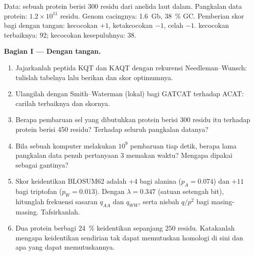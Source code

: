 \begin{problem}
\label{pb:b3:bioinformatics:1}
Data: sebuah protein berisi \num{300} residu dari anelida laut dalam.
Pangkalan data protein: $1.2\times 10^{11}$ residu. Genom cacingnya:
\qty{1.6}{Gb}, \qty{38}{\%} GC. Pemberian skor bagi  dengan tangan:
kecocokan $+1$, ketakcocokan $-1$, celah $-1$.  kecocokan 
terbaiknya: $92$; kecocokan kesepuluhnya: $38$.

\medskip
\noindent\textbf{Bagian I --- Dengan tangan.}
\begin{enumerate}
  \item Jajarkanlah peptida KQT dan KAQT dengan rekurensi
        Needleman--Wunsch: tulislah tabelnya lalu berikan  dan
        skor optimumnya.
  \item Ulangilah dengan Smith--Waterman (lokal) bagi GATCAT terhadap ACAT:
        carilah  terbaiknya dan skornya.
  \item Berapa pembaruan sel yang dibutuhkan  protein
        berisi \num{300} residu itu terhadap protein berisi \num{450}
        residu? Terhadap seluruh pangkalan datanya?
  \item Bila sebuah komputer melakukan $10^{9}$ pembaruan tiap detik, berapa
        lama  pangkalan data penuh pertanyaan 3 memakan waktu?
        Mengapa  dipakai sebagai gantinya?
  \item Skor keidentikan BLOSUM62 adalah $+4$ bagi alanina ($p_{A} =
        0.074$) dan $+11$ bagi triptofan ($p_{W} = 0.013$). Dengan
        $\lambda = 0.347$ (satuan setengah bit), hitunglah frekuensi
        sasaran $q_{AA}$ dan $q_{WW}$, serta nisbah $q/p^{2}$ bagi
        masing-masing. Tafsirkanlah.
  \item Dua protein berbagi \qty{24}{\%} keidentikan sepanjang $250$ residu.
        Katakanlah mengapa keidentikan sendirian tak dapat memutuskan
        homologi di sini dan apa yang dapat memutuskannya.
\end{enumerate}


\end{problem}
